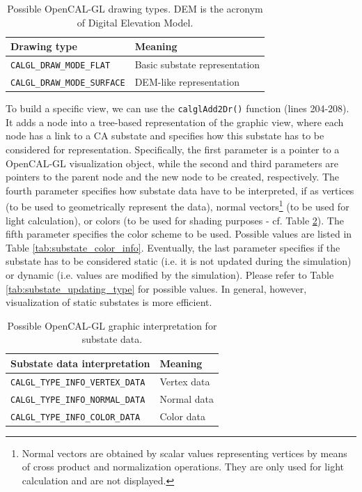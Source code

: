 \begin{table}
  \centering
  \footnotesize
  \begin{tabular}{l|l}
    \hline
    Drawing type & Meaning \\
    \hline
    \verb'CALGL_DRAW_MODE_FLAT'    & Basic substate representation \\
    \verb'CALGL_DRAW_MODE_SURFACE' & DEM-like representation \\
    \hline
  \end{tabular}
  \caption{Possible OpenCAL-GL drawing types. DEM is the acronym of Digital Elevation Model.}
  \label{tab:draw_modes}
\end{table}

To build a specific view, we can use the
\verb'calglAdd2Dr()' function (lines 204-208). It adds a
node into a tree-based representation of the graphic view, where each
node has a link to a CA substate and specifies how this substate has
to be considered for representation. Specifically, the first parameter
is a pointer to a OpenCAL-GL visualization object, while the second
and third parameters are pointers to the parent node and the new node
to be created, respectively. The fourth parameter specifies how
substate data have to be interpreted, if as vertices (to be used to
geometrically represent the data), normal vectors\footnote{Normal
  vectors are obtained by scalar values representing vertices by means
  of cross product and normalization operations. They are only used
  for light calculation and are not displayed.} (to be used for light
calculation), or colors (to be used for shading purposes - cf. Table
\ref{tab:substate_type_info}). The fifth parameter specifies the color
scheme to be used. Possible values are listed in Table
\ref{tab:substate_color_info}. Eventually, the last parameter
specifies if the substate has to be considered static (i.e. it is not
updated during the simulation) or dynamic (i.e. values are modified by
the simulation). Please refer to Table
\ref{tab:substate_updating_type} for possible values. In general,
however, visualization of static substates is more efficient.

\begin{table}
  \centering
  \small
  \begin{tabular}{l|l}
    \hline
    Substate data interpretation & Meaning\\
    \hline
    \verb'CALGL_TYPE_INFO_VERTEX_DATA' & Vertex data\\
    \verb'CALGL_TYPE_INFO_NORMAL_DATA' & Normal data\\
    \verb'CALGL_TYPE_INFO_COLOR_DATA'  & Color data\\
    \hline
  \end{tabular}
  \caption{Possible OpenCAL-GL graphic interpretation for substate data.}
  \label{tab:substate_type_info}
\end{table}

